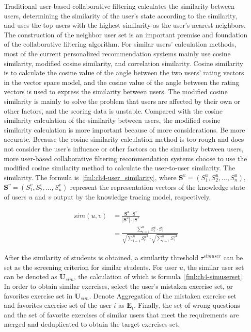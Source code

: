 Traditional user-based collaborative filtering calculates the similarity between users, determining the similarity of the user's state according to the similarity, and uses the top users with the highest similarity as the user's nearest neighbors. The construction of the neighbor user set is an important premise and foundation of the collaborative filtering algorithm. For similar users' calculation methods, most of the current personalized recommendation systems mainly use cosine similarity, modified cosine similarity, and correlation similarity. Cosine similarity is to calculate the cosine value of the angle between the two users' rating vectors in the vector space model, and the cosine value of the angle between the rating vectors is used to express the similarity between users. The modified cosine similarity is mainly to solve the problem that users are affected by their own or other factors, and the scoring data is unstable. Compared with the cosine similarity calculation of the similarity between users, the modified cosine similarity calculation is more important because of more considerations. Be more accurate. Because the cosine similarity calculation method is too rough and does not consider the user's influence or other factors on the similarity between users, more user-based collaborative filtering recommendation systems choose to use the modified cosine similarity method to calculate the user-to-user similarity. The similarity. The formula is~\ref{fml:ch4-user_similarity}, where \(\mathbf{S}^u=(S^u_1,S^u_2,\ldots,S^u_n)\), \(\mathbf{S}^v=(S^v_1,S^v_2,\ldots, S^v_n)\) represent the representation vectors of the knowledge state of users \(u\) and \(v\) output by the knowledge tracing model, respectively.

\begin{align}\label{fml:ch4-user_similarity}
    \begin{split}
        sim(u, v) & =\frac{\mathbf{S}^u \cdot \mathbf{S}^v}{|\mathbf{S}^u|\cdot |\mathbf{S}^v}                                                                 \\
        & =\frac{\sum\limits_{i = 1}^{n}{S^u_i\cdot S^v_i}}{\sqrt{\sum\limits_{i = 1}^{n}{{S^u_i}^2}}\cdot\sqrt{\sum\limits_{i = 1}^{n}{{S^v_i}^2}}}
    \end{split}
\end{align}

After the similarity of students is obtained, a similarity threshold \(\tau^{simuser}\) can be set as the screening criterion for similar students. For user \(u\), the similar user set can be denoted as \(\mathbf{U}_{sim}\), the calculation of which is formula~\ref{fml:ch4-simuserset}. In order to obtain similar exercises, select the user's mistaken exercise set, or favorites exercise set in \(\mathbf{U}_{sim}\). Denote Aggregation of the mistaken exercise set and favorites exercise set of the user \(i\) as \(\mathbf{E}_{i}\). Finally, the set of wrong questions and the set of favorite exercises of similar users that meet the requirements are merged and deduplicated to obtain the target exercises set.

